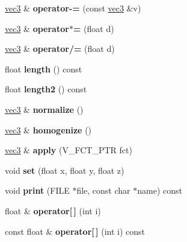 \begin{DoxyCompactItemize}
\item 
\hypertarget{classvec3_a53beb9bf7c29bd960067f1980af16616}{\hyperlink{classvec3}{vec3} \& {\bfseries operator-\/=} (const \hyperlink{classvec3}{vec3} \&v)}\label{classvec3_a53beb9bf7c29bd960067f1980af16616}

\item 
\hypertarget{classvec3_a31f1b0795dd08111e097f458b1298fc4}{\hyperlink{classvec3}{vec3} \& {\bfseries operator$\ast$=} (float d)}\label{classvec3_a31f1b0795dd08111e097f458b1298fc4}

\item 
\hypertarget{classvec3_ac61caa794b99be2629a8508bd17aa976}{\hyperlink{classvec3}{vec3} \& {\bfseries operator/=} (float d)}\label{classvec3_ac61caa794b99be2629a8508bd17aa976}

\item 
\hypertarget{classvec3_ad622150f0a08c548b062775dd5d76a41}{float {\bfseries length} () const }\label{classvec3_ad622150f0a08c548b062775dd5d76a41}

\item 
\hypertarget{classvec3_ae5974e67294836736f5123aff4e101ca}{float {\bfseries length2} () const }\label{classvec3_ae5974e67294836736f5123aff4e101ca}

\item 
\hypertarget{classvec3_a60a812fe6ca372c1d3f73cf303616760}{\hyperlink{classvec3}{vec3} \& {\bfseries normalize} ()}\label{classvec3_a60a812fe6ca372c1d3f73cf303616760}

\item 
\hypertarget{classvec3_ab61ef49bbf503f5036305e8e93c87b3b}{\hyperlink{classvec3}{vec3} \& {\bfseries homogenize} ()}\label{classvec3_ab61ef49bbf503f5036305e8e93c87b3b}

\item 
\hypertarget{classvec3_a4ebbd3e3e9bbbc518182a59d4421008b}{\hyperlink{classvec3}{vec3} \& {\bfseries apply} (V\-\_\-\-F\-C\-T\-\_\-\-P\-T\-R fct)}\label{classvec3_a4ebbd3e3e9bbbc518182a59d4421008b}

\item 
\hypertarget{classvec3_adc914c651687e311dd96aad8eec953c6}{void {\bfseries set} (float x, float y, float z)}\label{classvec3_adc914c651687e311dd96aad8eec953c6}

\item 
\hypertarget{classvec3_ae6d60a16e6d86732226c665ab22b1a84}{void {\bfseries print} (F\-I\-L\-E $\ast$file, const char $\ast$name) const }\label{classvec3_ae6d60a16e6d86732226c665ab22b1a84}

\item 
\hypertarget{classvec3_a09b581955363f59d035a5aeb6b037f06}{float \& {\bfseries operator\mbox{[}$\,$\mbox{]}} (int i)}\label{classvec3_a09b581955363f59d035a5aeb6b037f06}

\item 
\hypertarget{classvec3_a25f1ca4c215d7d5f4d1778d72c65517c}{const float \& {\bfseries operator\mbox{[}$\,$\mbox{]}} (int i) const }\label{classvec3_a25f1ca4c215d7d5f4d1778d72c65517c}

\end{DoxyCompactItemize}
